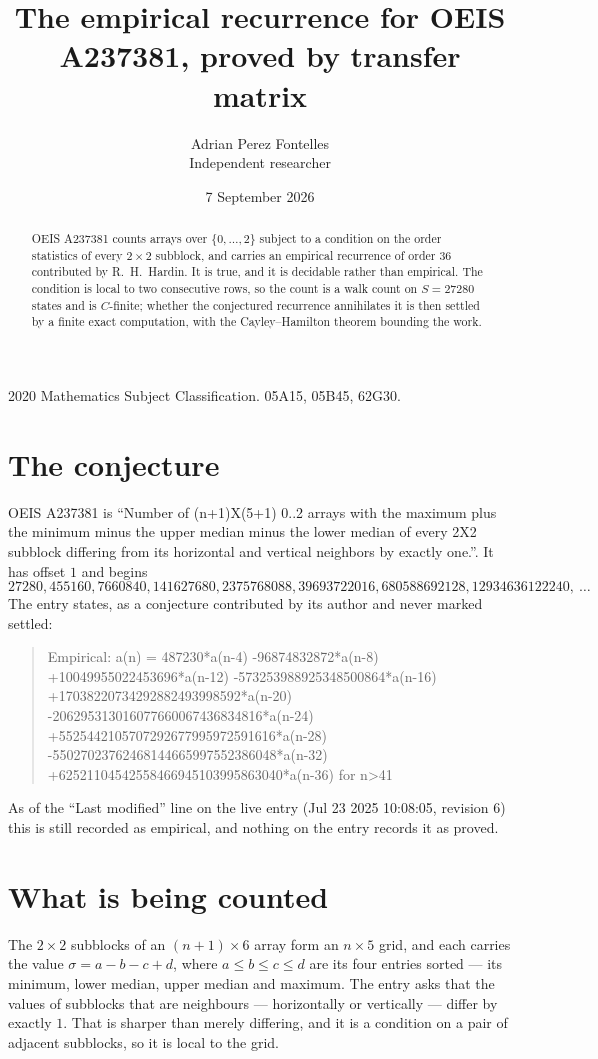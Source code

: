 \documentclass[11pt,a4paper]{article}
\title{The empirical recurrence for OEIS A237381, proved by transfer matrix}
\author{Adrian Perez Fontelles\\ \small Independent researcher}
\date{7 September 2026}
\theoremstyle{plain}
\theoremstyle{definition}
\begin{document}
\maketitle

\begin{abstract}
OEIS A237381 counts arrays over $\{0,\dots,2\}$ subject to a condition on the order
statistics of every $2\times2$ subblock, and carries an empirical recurrence of order
$36$ contributed by R.~H.~Hardin. It is true, and it is decidable rather than empirical.
The condition is local to two consecutive rows, so the count is a walk count on $S=27280$
states and is $C$-finite; whether the conjectured recurrence annihilates it is then settled by
a finite exact computation, with the Cayley--Hamilton theorem bounding the work.
\end{abstract}

\noindent\small 2020 Mathematics Subject Classification. 05A15, 05B45, 62G30.\normalsize

\section{The conjecture}

OEIS A237381 is ``Number of (n+1)X(5+1) 0..2 arrays with the maximum plus the minimum minus the upper median minus the lower median of every 2X2 subblock differing from its horizontal and vertical neighbors by exactly one.''. It has offset $1$ and begins
\[
27280, 455160, 7660840, 141627680, 2375768088, 39693722016, 680588692128, 12934636122240,\ \dots
\]
The entry states, as a conjecture contributed by its author and never marked settled:
\begin{quote}
Empirical: a(n) = 487230*a(n-4) -96874832872*a(n-8) +10049955022453696*a(n-12) -573253988925348500864*a(n-16) +17038220734292882493998592*a(n-20) -206295313016077660067436834816*a(n-24) +5525442105707292677995972591616*a(n-28) -55027023762468144665997552386048*a(n-32) +62521104542558466945103995863040*a(n-36) for n>41
\end{quote}
As of the ``Last modified'' line on the live entry (Jul 23 2025 10:08:05, revision 6) this is still
recorded as empirical, and nothing on the entry records it as proved.

\section{What is being counted}

The $2\times2$ subblocks of an $(n+1)\times6$ array form an
$n\times5$ grid, and each carries the value $\sigma=a-b-c+d$, where $a\le b\le c\le d$ are its four entries sorted --- its minimum, lower median, upper median and maximum. The entry asks that the values of
subblocks that are neighbours --- horizontally or vertically --- differ by exactly $1$.
That is sharper than merely differing, and it is a condition on a pair of adjacent subblocks,
so it is local to the grid.
\end{document}
